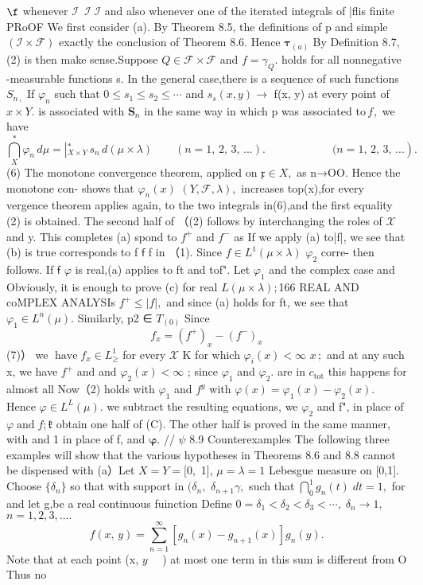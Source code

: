 $\boldsymbol{\f}$ whenever $\scriptstyle{\mathcal{I}}\ \;{\mathcal{I}}\;{\mathcal{I}}$ and also whenever one of the iterated integrals of |flis finite PRoOF We first consider (a). By Theorem 8.5, the definitions of p and simple $({\mathcal{I}}\times{\mathcal{F}})$ exactly the conclusion of Theorem 8.6. Hence $\mathbf{\tau}_{(a)}$ By Definition 8.7,(2) is then make sense.Suppose $Q\in{\mathcal{F}}\times{\mathcal{F}}$ and $f=\gamma_{Q}.$ holds for all nonnegative -measurable functions s. In the general case,there is a sequence of such functions $S_{n\,,}$ If $\varphi_{n}$ such that $0\leq s_{1}\leq s_{2}\leq\cdots$ and $s_{s}(x,y)\to$ f(x, y) at every point of $x\times Y.$ is associated with ${\boldsymbol{S}}_{n}$ in the same way in which p was associated $\mathrm{to}\,f_{},$ we have $$ \bigcap_{X}^{*}\varphi_{n}\,d\mu=\left\vert_{X\times Y}^{*}\,s_{n}\,d(\mu\times\lambda)\qquad(n=1,\,2,\,3,\,...).\qquad\qquad\qquad(n=1,\,2,\,3,\,...\right). $$ (6) The monotone convergence theorem, applied on ${\mathfrak{x}}\in X,$ as n→OO. Hence the monotone con- shows that $\varphi_{n}(x)$ $(Y,{\mathcal{F}},\lambda),$ increases top(x),for every vergence theorem applies again, to the two integrals in(6),and the first equality (2) is obtained. The second half of （(2) follows by interchanging the roles of $\scriptstyle{\mathcal{X}}$ and y. This completes (a) spond to $f^{+}$ and $f^{-}$ as If we apply (a) to|f|, we see that (b) is true corresponds to f $\boldsymbol{\mathsf{f}}$ f in （1). Since $f\in L^{1}(\mu\times\lambda)$ $\varphi_{2}$ corre- then follows. If $\boldsymbol{\mathsf{f}}$ $\varphi$ is real,(a) applies to ft and tof". Let $\varphi_{1}$ and the complex case and Obviously, it is enough to prove (c) for real $L(\mu\times\lambda);$166 REAL AND coMPLEX ANALYSIs $f^{+}\leq|f|,$ and since (a) holds for ft, we see that $\varphi_{1}\in L^{n}(\mu).$ Similarly, p2 ∈ $\scriptstyle T_{(0)}$ Since $$ f_{x}=(f^{+})_{x}-(f^{-})_{x} $$ (7)） we $\operatorname{have}f_{x}\in L_{\geq}^{1}$ for every $\scriptstyle{\mathcal{X}}$ K for which $\varphi_{i}(x)<\infty$ $x\,;$ and at any such x, we have $f^{+}$ and and $\varphi_{2}(x)<\infty$ ; since $\varphi_{1}$ and $\varphi_{2}.$ are in $c_{\mathrm{tot}}$ this happens for almost all Now（2) holds with $\varphi_{1}$ and $f^{y}$ with $\varphi(x)=\varphi_{1}(x)-\varphi_{2}(x).$ Hence $\varphi\in L^{L}(\mu).$ we subtract the resulting equations, we $\varphi_{2}$ and f", in place of $\varphi\operatorname{and}f;{\mathfrak{k}}$ obtain one half of (C). The other half is proved in the same manner, with and 1 in place of f, and ${\boldsymbol{\varphi}}.$ // $\psi$ 8.9 Counterexamples The following three examples will show that the various hypotheses in Theorems 8.6 and 8.8 cannot be dispensed with (a）Let $X=Y=[0,$ 1], $\mu=\lambda=1$ Lebesgue measure on [0,1]. Choose $\{\delta_{n}\}$ so that with support in $(\delta_{n},$ $\delta_{n+1}\gamma,$ such that $\textstyle{\bigcap_{0}^{1}{g_{n}(t)}\;d t}=1,$ for and let g,be a real continuous fuinction Define $0=\delta_{1}<\delta_{2}<\delta_{3}<\cdots,\;\delta_{n}\to1,$ $n=1,2,3,\ldots.$ $$ f(x,\,y)=\sum_{n=1}^{\infty}\left[g_{n}(x)-g_{n+1}(x)\right]g_{n}(y). $$ Note that at each point (x, $y\quad$ ) at most one term in this sum is different from O Thus no 